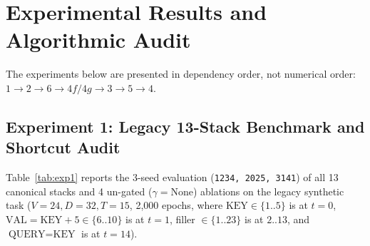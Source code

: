 \documentclass[11pt,a4paper]{article}
\begin{document}
\section{Experimental Results and Algorithmic Audit}

The experiments below are presented in dependency order, not numerical order: $1 \to 2 \to 6 \to 4f/4g \to 3 \to 5 \to 4$.

\subsection{Experiment 1: Legacy 13-Stack Benchmark and Shortcut Audit}

Table~\ref{tab:exp1} reports the 3-seed evaluation (\texttt{1234, 2025, 3141}) of all 13 canonical stacks and 4 un-gated ($\gamma=\text{None}$) ablations on the legacy synthetic task ($V=24, D=32, T=15$, 2,000 epochs, where $\text{KEY} \in \{1..5\}$ is at $t=0$, $\text{VAL} = \text{KEY}+5 \in \{6..10\}$ is at $t=1$, filler $\in \{1..23\}$ is at $2..13$, and $\text{QUERY}=\text{KEY}$ is at $t=14$).
\end{document}
